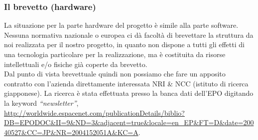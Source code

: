 \subsubsection{Il brevetto (hardware)}
La situazione per la parte hardware del progetto è simile alla parte software.\\
Nessuna normativa nazionale o europea ci dà facoltà di brevettare la struttura da noi realizzata per il nostro progetto, in quanto non dispone a tutti gli effetti di una tecnologia particolare per la realizzazione, ma è costituita da risorse intellettuali e/o fisiche già coperte da brevetto.\\
Dal punto di vista brevettuale quindi non possiamo che fare un apposito contratto con l'azienda direttamente interessata NRI \& NCC (istituto di ricerca giapponese). La ricerca è stata effettuata presso la banca dati dell'EPO digitando la keyword \textit{``newsletter''}, 
\url{http://worldwide.espacenet.com/publicationDetails/biblio?DB=EPODOC\&II=9\&ND=3\&adjacent=true\&locale=en\_EP\&FT=D\&date=20040527\&CC=JP\&NR=2004152051A\&KC=A}.

